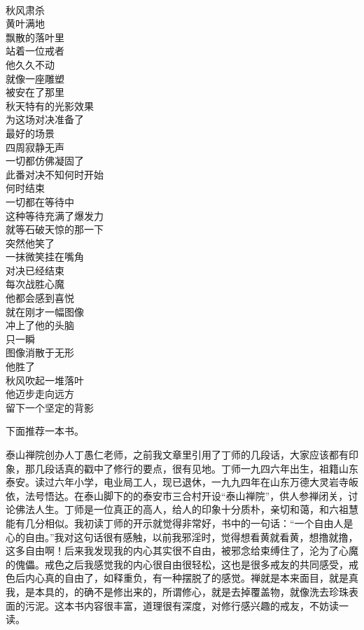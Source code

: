 \begin{poem}[秋风中的对决]
    \begin{multicols}{4}
        \centering~\\
        秋风肃杀 \\ 黄叶满地 \\ 飘散的落叶里 \\ 站着一位戒者 \\ 他久久不动 \\ 就像一座雕塑 \\ 被安在了那里 \\ 秋天特有的光影效果 \\ 为这场对决准备了 \\ 最好的场景 \\ 四周寂静无声 \\ 一切都仿佛凝固了 \\ 此番对决不知何时开始 \\ 何时结束 \\ 一切都在等待中 \\ 这种等待充满了爆发力 \\ 就等石破天惊的那一下 \\ 突然他笑了 \\ 一抹微笑挂在嘴角 \\ 对决已经结束 \\ 每次战胜心魔 \\ 他都会感到喜悦 \\ 就在刚才一幅图像 \\ 冲上了他的头脑 \\ 只一瞬 \\ 图像消散于无形 \\ 他胜了 \\ 秋风吹起一堆落叶 \\ 他迈步走向远方 \\ 留下一个坚定的背影
    \end{multicols}
\end{poem}

下面推荐一本书。

\begin{book}
    泰山禅院创办人丁愚仁老师，之前我文章里引用了丁师的几段话，大家应该都有印象，那几段话真的戳中了修行的要点，很有见地。丁师一九四六年出生，祖籍山东泰安。读过六年小学，电业局工人，现已退休，一九九四年在山东万德大灵岩寺皈依，法号悟达。在泰山脚下的的泰安市三合村开设“泰山禅院”，供人参禅闭关，讨论佛法人生。丁师是一位真正的高人，给人的印象十分质朴，亲切和蔼，和六祖慧能有几分相似。我初读丁师的开示就觉得非常好，书中的一句话：“一个自由人是心的自由。”我对这句话很有感触，以前我邪淫时，觉得想看黄就看黄，想撸就撸，这多自由啊！后来我发现我的内心其实很不自由，被邪念给束缚住了，沦为了心魔的傀儡。戒色之后我感觉我的内心很自由很轻松，这也是很多戒友的共同感受，戒色后内心真的自由了，如释重负，有一种摆脱了的感觉。禅就是本来面目，就是真我，是本具的，的确不是修出来的，所谓修心，就是去掉覆盖物，就像洗去珍珠表面的污泥。这本书内容很丰富，道理很有深度，对修行感兴趣的戒友，不妨读一读。
\end{book}
